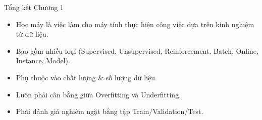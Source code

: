\documentclass[aspectratio=169]{beamer}
\begin{document}
\begin{frame}{Tổng kết Chương 1}
\begin{itemize}
    \item Học máy là việc làm cho máy tính thực hiện công việc dựa trên kinh nghiệm từ dữ liệu.
    \item Bao gồm nhiều loại (Supervised, Unsupervised, Reinforcement, Batch, Online, Instance, Model).
    \item Phụ thuộc vào chất lượng \& số lượng dữ liệu.
    \item Luôn phải cân bằng giữa Overfitting và Underfitting.
    \item Phải đánh giá nghiêm ngặt bằng tập Train/Validation/Test.
\end{itemize}
\end{frame}
\end{document}
